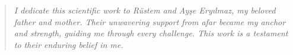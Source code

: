 \clearpage
\thispagestyle{empty}
\null
\newpage

\clearpage
\thispagestyle{empty}
\null\vfill

\begin{quote}

\textit{\selectfont I dedicate this scientific work to Rüstem and Ayşe Eryılmaz, my beloved father and mother. Their unwavering support from afar became my anchor and strength, guiding me through every challenge. This work is a testament to their enduring belief in me.}

\end{quote}

\vfill\null
\newpage

\clearpage
\thispagestyle{empty}
\null
\newpage